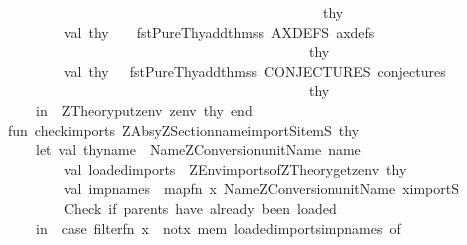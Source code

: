 \begin{isabellebody}
\ \ \ \ \ \ \ \ \ \ \ \ \ \ \ \ \ \ \ \ \ \ \ \ \ \ \ \ \ \ \ \ \ \ \ \ \ \ \ \ \ \ \ \ \ \ \ \ thy{\isacharparenright}\ \isanewline
\ \ \ \ \ \ \ \ \ \ \ val\ thy{\isacharprime}{\isacharprime}\ \ \ {\isacharequal}\ fst{\isacharparenleft}PureThy{\isachardot}add{\isacharunderscore}thmss\ {\isacharbrackleft}{\isacharparenleft}{\isacharparenleft}{\isachardoublequote}AXDEFS{\isachardoublequote}{\isacharcomma}\ axdefs{\isacharparenright}{\isacharcomma}{\isacharbrackleft}{\isacharbrackright}{\isacharparenright}{\isacharbrackright}\isanewline
\ \ \ \ \ \ \ \ \ \ \ \ \ \ \ \ \ \ \ \ \ \ \ \ \ \ \ \ \ \ \ \ \ \ \ \ \ \ \ \ \ \ \ \ \ \ thy{\isacharprime}{\isacharparenright}\isanewline
\ \ \ \ \ \ \ \ \ \ \ val\ thy{\isacharprime}{\isacharprime}{\isacharprime}\ \ {\isacharequal}\ fst{\isacharparenleft}PureThy{\isachardot}add{\isacharunderscore}thmss\ {\isacharbrackleft}{\isacharparenleft}{\isacharparenleft}{\isachardoublequote}CONJECTURES{\isachardoublequote}{\isacharcomma}\ conjectures{\isacharparenright}{\isacharcomma}{\isacharbrackleft}{\isacharbrackright}{\isacharparenright}{\isacharbrackright}\isanewline
\ \ \ \ \ \ \ \ \ \ \ \ \ \ \ \ \ \ \ \ \ \ \ \ \ \ \ \ \ \ \ \ \ \ \ \ \ \ \ \ \ \ \ \ \ \ thy{\isacharprime}{\isacharprime}{\isacharparenright}\isanewline
\ \ \ \ \ \ \ in\ \ ZTheory{\isachardot}put{\isacharunderscore}zenv\ zenv{\isacharprime}{\isacharprime}\ thy{\isacharprime}{\isacharprime}{\isacharprime}\ end\isanewline
\isanewline
\ \ \ fun\ check{\isacharunderscore}imports\ {\isacharparenleft}ZAbsy{\isachardot}ZSection{\isacharparenleft}name{\isacharcomma}importS{\isacharcomma}itemS{\isacharparenright}{\isacharparenright}\ thy\ {\isacharequal}\ \isanewline
\ \ \ \ \ \ \ let\ val\ thy{\isacharunderscore}name\ {\isacharequal}\ {\isacharhash}Name{\isacharparenleft}ZConversion{\isachardot}unitName\ name{\isacharparenright}\isanewline
\ \ \ \ \ \ \ \ \ \ \ val\ loaded{\isacharunderscore}imports\ \ {\isacharequal}ZEnv{\isachardot}imports{\isacharunderscore}of{\isacharparenleft}ZTheory{\isachardot}get{\isacharunderscore}zenv\ thy{\isacharparenright}\isanewline
\ \ \ \ \ \ \ \ \ \ \ val\ impnames\ {\isacharequal}\ map{\isacharparenleft}fn\ x{\isacharequal}{\isachargreater}\ {\isacharparenleft}{\isacharhash}Name{\isacharparenleft}ZConversion{\isachardot}unitName\ x{\isacharparenright}{\isacharparenright}{\isacharparenright}importS{\isacharsemicolon}\isanewline
\ \ \ \ \ \ \ \ \ \ \ {\isacharparenleft}{\isacharasterisk}Check\ if\ parents\ have\ already\ been\ loaded{\isacharasterisk}{\isacharparenright}\isanewline
\ \ \ \ \ \ \ in\ \ case\ filter{\isacharparenleft}fn\ x\ {\isacharequal}{\isachargreater}\ not{\isacharparenleft}x\ mem\ loaded{\isacharunderscore}imports{\isacharparenright}{\isacharparenright}{\isacharparenleft}impnames{\isacharparenright}\ of\isanewline

\end{isabellebody}
